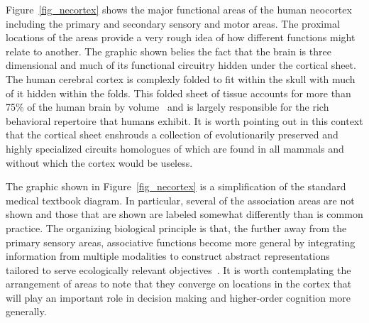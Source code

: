 \documentclass[letterpaper,11pt]{article}
\def\urlh#1{{}}
\begin{document}
Figure~{\urlh{#fig_Human_Brain_Neocortex_Function}{\ref{fig_necortex}}} shows the major functional areas of the human neocortex including the primary and secondary sensory and motor areas. The proximal locations of the areas provide a very rough idea of how different functions might relate to another. The graphic shown belies the fact that the brain is three dimensional and much of its functional circuitry hidden under the cortical sheet. The human cerebral cortex is complexly folded to fit within the skull with much of it hidden within the folds. This folded sheet of tissue accounts for more than 75\% of the human brain by volume~\cite{SwansonTiN-95} and is largely responsible for the rich behavioral repertoire that humans exhibit. It is worth pointing out in this context that the cortical sheet enshrouds a collection of evolutionarily preserved and highly specialized circuits homologues of which are found in all mammals and without which the cortex would be useless.

The graphic shown in Figure~{\urlh{#fig_Human_Brain_Neocortex_Function}{\ref{fig_necortex}}} is a simplification of the standard medical textbook diagram. In particular, several of the association areas are not shown and those that are shown are labeled somewhat differently than is common practice. The organizing biological principle is that, the further away from the primary sensory areas, associative functions become more general by integrating information from multiple modalities to construct abstract representations tailored to serve ecologically relevant objectives~\cite{Higher_Cortical_Functions_Association}. It is worth contemplating the arrangement of areas to note that they converge on locations in the cortex that will play an important role in decision making and higher-order cognition more generally.

\end{document}

